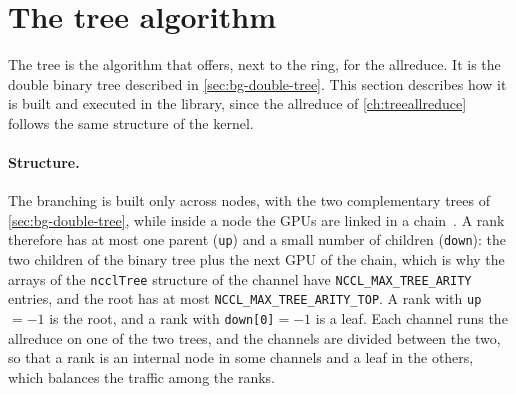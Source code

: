 \section{The tree algorithm}\label{sec:nccl-tree}
The tree is the algorithm that \nccl{} offers, next to the ring, for the allreduce.
It is the double binary tree described in \cref{sec:bg-double-tree}.
This section describes how it is built and executed in the library, since the allreduce of \cref{ch:treeallreduce} follows the same structure of the kernel.
\paragraph{Structure.}
The branching is built only across nodes, with the two complementary trees of \cref{sec:bg-double-tree}, while inside a node the GPUs are linked in a chain~\cite{hu2025demystifying}.
A rank therefore has at most one parent (\texttt{up}) and a small number of children (\texttt{down}): the two children of the binary tree plus the next GPU of the chain, which is why the arrays of the \texttt{ncclTree} structure of the channel have \texttt{NCCL\_MAX\_TREE\_ARITY} entries, and the root has at most \texttt{NCCL\_MAX\_TREE\_ARITY\_TOP}.
A rank with \texttt{up}$=-1$ is the root, and a rank with \texttt{down[0]}$=-1$ is a leaf.
Each channel runs the allreduce on one of the two trees, and the channels are divided between the two, so that a rank is an internal node in some channels and a leaf in the others, which balances the traffic among the ranks.
